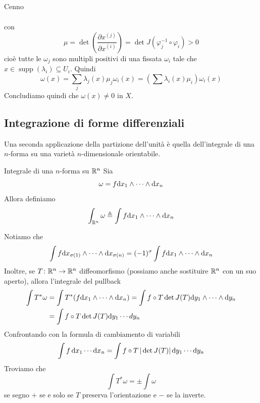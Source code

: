 \documentclass[a4paper]{article}
\begin{document}
\begin{snippetproof}{Cenno}
\begin{ffiproof}
\begin{align*}
        \end{align*}
        con \[
            \mu = \det\left(
                \frac{
                    \partial x^{(j)}
                }{
                    \partial x^{(i)}
                }
            \right) = \det J(\varphi_j^{-1} \circ \varphi_i) > 0
        \]
        cioè tutte le \(\omega_j\) sono multipli positivi di una fissata
        \(\omega_i\) tale che \(x \in \operatorname{supp}(\lambda_i) \subseteq U_i\).
        Quindi \[
            \omega(x) = \sum_j \lambda_j(x) \mu_j \omega_i(x)
            = \left(
                \sum \lambda_i(x) \mu_i
            \right) \omega_i(x)
        \]
        Concludiamo quindi che \(\omega(x) \neq 0\) in \(X\).
    \end{ffiproof}
\end{snippetproof}

\subsection{Integrazione di forme differenziali}

Una seconda applicazione della partizione dell'unità è quella dell'integrale di una
\(n\)-forma su una varietà \(n\)-dimensionale orientabile.

\begin{snippetdefinition}{Integrale di una \(n\)-forma su \(\mathbb{R}^n\)}
    Sia \[
        \omega = f\text dx_1 \wedge \cdots \wedge \text dx_n
    \]
    Allora definiamo \[
        \int_{\mathbb{R}^n} \omega \triangleq \int f\text dx_1 \wedge \cdots \wedge \text dx_n
    \]
\end{snippetdefinition}

Notiamo che
\[
    \int f\text dx_{\sigma(1)} \wedge \cdots \wedge \text dx_{\sigma(n)}
    = (-1)^\sigma \int f\text dx_1 \wedge \cdots \wedge \text dx_n
\]
Inoltre, se \(T \colon \mathbb{R}^n \to \mathbb{R}^n\)
diffeomorfismo
(possiamo anche sostituire \(\mathbb{R}^n\) con un suo aperto), allora l'integrale del pullback
\begin{align*}
    \int T^\ast \omega &= \int T^\ast (f\text dx_1 \wedge \cdots \wedge \text dx_n)
    = \int f \circ T \det J(T) \text dy_1 \wedge \cdots \wedge \text dy_n \\
    &= \int f \circ T \det J(T) \text dy_1 \cdots dy_n
\end{align*}
Confrontando con la formula di cambiamento di variabili
\[
    \int f\,\text dx_1 \cdots \text dx_n
    =
    \int f \circ T \,|\det J(T)|\, \text dy_1 \cdots \text dy_n
\]
Troviamo che \[
    \int T^\ast \omega = \pm \int \omega
\]
se segno \(+\) se e solo se \(T\) preserva l'orientazione e \(-\) se la inverte.
\end{document}
